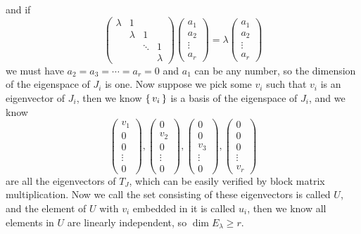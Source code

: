 \documentclass[a4paper]{article}
\theoremstyle{mystyle}
\newcommand{\6}{\partial}
\begin{document}
 and if
 \[
    \begin{pmatrix}
        \lambda &1  \\
        &\lambda &1  \\
        &&\ddots &1\\ 
        &&&\lambda
     \end{pmatrix}
     \begin{pmatrix}
        a_1 \\
        a_2 \\ 
        \vdots \\
        a_r
     \end{pmatrix}
     =
     \lambda
     \begin{pmatrix}
     a_1 \\
     a_2 \\ 
     \vdots \\
     a_r
     \end{pmatrix}
 \]
 we must have $a_2=a_3=\cdots=a_r=0$ and $a_1$ can be any number, so the dimension of the eigenspace of
 $J_i$ is one. Now suppose we pick some $v_i$ such that $v_i$ is an eigenvector of $J_i$, then we know $\set{v_i}$ is a basis of
 the eigenspace of $J_i$, and we know
 \[
 \begin{pmatrix}
    v_1 \\ 0 \\ 0 \\ \vdots \\ 0
 \end{pmatrix}, 
 \begin{pmatrix}
    0 \\ v_2 \\ 0 \\ \vdots \\ 0
 \end{pmatrix},
 \begin{pmatrix}
    0 \\ 0 \\ v_3 \\ \vdots \\ 0
 \end{pmatrix},
 \begin{pmatrix}
    0 \\ 0 \\ 0 \\ \vdots \\ v_r
 \end{pmatrix}
 \] are all the eigenvectors of $T_J$, which can be easily verified by block matrix multiplication.
 Now we call the set consisting of these eigenvectors is called $U$, and the element of $U$ with $v_i$ embedded in it is called $u_i$, then we know all elements in $U$ are linearly independent, so $\dim E_\lambda \ge r.$
\end{document}
